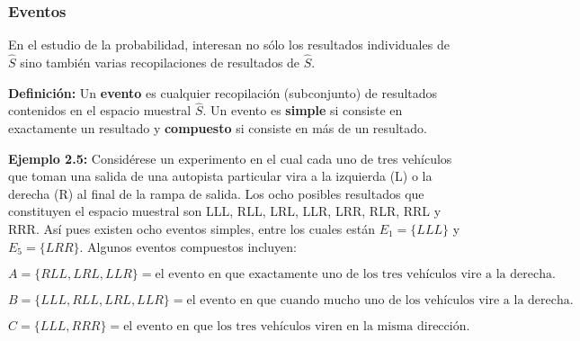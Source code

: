\documentclass[a4paper]{article}
\begin{document}
\subsubsection{Eventos}
En el estudio de la probabilidad, interesan no sólo los resultados individuales de $\hat{S}$ sino también varias recopilaciones de resultados de $\hat{S}$.

\textbf{Definición:}
Un \textbf{evento} es cualquier recopilación (subconjunto) de resultados contenidos en el espacio muestral $\hat{S}$. Un evento es \textbf{simple} si consiste en exactamente un resultado y \textbf{compuesto} si consiste en más de un resultado.


\textbf{Ejemplo 2.5:}
Considérese un experimento en el cual cada uno de tres vehículos que toman una salida de una autopista particular vira a la izquierda (L) o la derecha (R) al final de la rampa de salida. Los ocho posibles resultados que constituyen el espacio muestral son LLL, RLL, LRL, LLR, LRR, RLR, RRL y RRR. Así pues existen ocho eventos simples, entre los cuales están $E_1 = \{LLL\}$ y $E_5 = \{LRR\}$. Algunos eventos compuestos incluyen:

$$ A = \{RLL, LRL, LLR\} = \text{el evento en que exactamente uno de los tres vehículos vire a la derecha.} $$

$$ B = \{LLL, RLL, LRL, LLR\} = \text{el evento en que cuando mucho uno de los vehículos vire a la derecha.} $$

$$ C = \{LLL, RRR\} = \text{el evento en que los tres vehículos viren en la misma dirección.} $$
\end{document}
